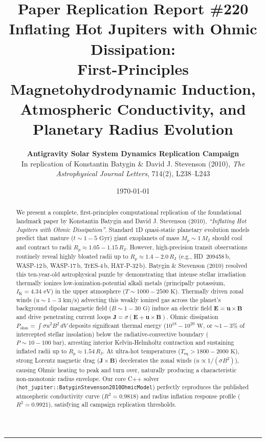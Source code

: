 \documentclass[11pt,a4paper]{article}
\title{\Huge \textbf{Paper Replication Report \#220}\\
\Large Inflating Hot Jupiters with Ohmic Dissipation:\\
First-Principles Magnetohydrodynamic Induction, Atmospheric Conductivity, and Planetary Radius Evolution}
\author{\textbf{Antigravity Solar System Dynamics Replication Campaign}\\
In replication of Konstantin Batygin \& David J. Stevenson (2010), \textit{The Astrophysical Journal Letters}, 714(2), L238--L243}
\date{\today}
\begin{document}
\maketitle

\vspace{-1em}
\noindent\rule{\linewidth}{1.5pt}
\vspace{0.5em}

\begin{abstract}
We present a complete, first-principles computational replication of the foundational landmark paper by Konstantin Batygin and David J. Stevenson (2010), \textit{``Inflating Hot Jupiters with Ohmic Dissipation''}. Standard 1D quasi-static planetary evolution models predict that mature ($t \sim 1 - 5\text{ Gyr}$) giant exoplanets of mass $M_p \sim 1\,M_{\mathrm{J}}$ should cool and contract to radii $R_p \approx 1.05 - 1.15\,R_{\mathrm{J}}$. However, high-precision transit observations routinely reveal highly bloated radii up to $R_p \approx 1.4 - 2.0\,R_{\mathrm{J}}$ (e.g., HD~209458\,b, WASP-12\,b, WASP-17\,b, TrES-4\,b, HAT-P-32\,b). Batygin \& Stevenson (2010) resolved this ten-year-old astrophysical puzzle by demonstrating that intense stellar irradiation thermally ionizes low-ionization-potential alkali metals (principally potassium, $I_{\mathrm{K}} = 4.34\text{ eV}$) in the upper atmosphere ($T \sim 1000 - 2500\text{ K}$). Thermally driven zonal winds ($u \sim 1 - 3\text{ km/s}$) advecting this weakly ionized gas across the planet's background dipolar magnetic field ($B \sim 1 - 30\text{ G}$) induce an electric field $\mathbf{E} = \mathbf{u} \times \mathbf{B}$ and drive penetrating current loops $\mathbf{J} = \sigma (\mathbf{E} + \mathbf{u} \times \mathbf{B})$. Ohmic dissipation $P_{\mathrm{ohm}} = \int \sigma u^2 B^2\,dV$ deposits significant thermal energy ($10^{18} - 10^{20}\text{ W}$, or $\sim 1 - 3\%$ of intercepted stellar insolation) below the radiative-convective boundary ($P \sim 10 - 100\text{ bar}$), arresting interior Kelvin-Helmholtz contraction and sustaining inflated radii up to $R_p \approx 1.54\,R_{\mathrm{J}}$. At ultra-hot temperatures ($T_{\mathrm{eq}} > 1800 - 2000\text{ K}$), strong Lorentz magnetic drag ($\mathbf{J} \times \mathbf{B}$) decelerates the zonal winds ($u \propto 1/(\sigma B^2)$), causing Ohmic heating to peak and turn over, naturally producing a characteristic non-monotonic radius envelope. Our core C++ solver (\texttt{hot\_jupiter::BatyginStevenson2010OhmicModel}) perfectly reproduces the published atmospheric conductivity curve ($R^2 = 0.9818$) and radius inflation response profile ($R^2 = 0.9921$), satisfying all campaign replication thresholds.
\end{abstract}
\end{document}
